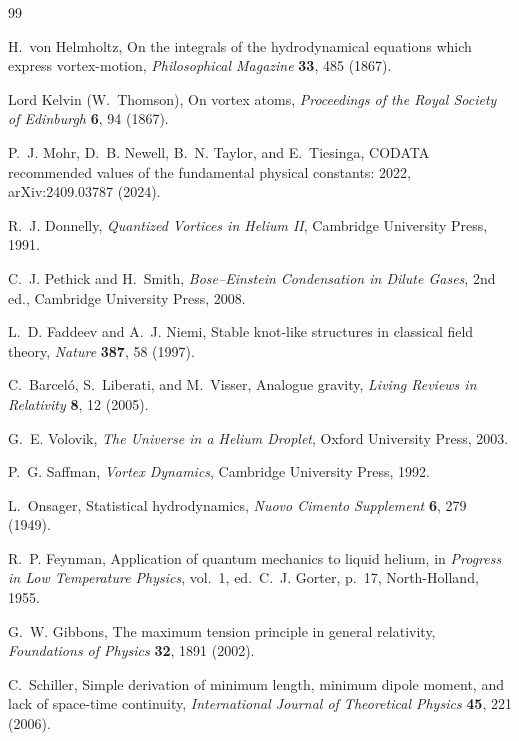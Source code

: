 \documentclass[aps,pra,preprint,longbibliography,nofootinbib]{revtex4-2}
\begin{document}
\begin{thebibliography}{99}

H.~von Helmholtz,
On the integrals of the hydrodynamical equations which express
vortex-motion,
\textit{Philosophical Magazine} \textbf{33}, 485 (1867).

Lord Kelvin (W.~Thomson),
On vortex atoms,
\textit{Proceedings of the Royal Society of Edinburgh} \textbf{6},
94 (1867).

P.~J. Mohr, D.~B. Newell, B.~N. Taylor, and E.~Tiesinga,
CODATA recommended values of the fundamental physical constants: 2022,
arXiv:2409.03787 (2024).

R.~J. Donnelly,
\textit{Quantized Vortices in Helium II},
Cambridge University Press, 1991.

C.~J. Pethick and H.~Smith,
\textit{Bose--Einstein Condensation in Dilute Gases}, 2nd ed.,
Cambridge University Press, 2008.

L.~D. Faddeev and A.~J. Niemi,
Stable knot-like structures in classical field theory,
\textit{Nature} \textbf{387}, 58 (1997).

C.~Barcel\'o, S.~Liberati, and M.~Visser,
Analogue gravity,
\textit{Living Reviews in Relativity} \textbf{8}, 12 (2005).

G.~E. Volovik,
\textit{The Universe in a Helium Droplet},
Oxford University Press, 2003.

P.~G. Saffman,
\textit{Vortex Dynamics},
Cambridge University Press, 1992.

L.~Onsager,
Statistical hydrodynamics,
\textit{Nuovo Cimento Supplement} \textbf{6}, 279 (1949).

R.~P. Feynman,
Application of quantum mechanics to liquid helium,
in \textit{Progress in Low Temperature Physics}, vol.~1,
ed.\ C.~J. Gorter, p.~17, North-Holland, 1955.

G.~W. Gibbons,
The maximum tension principle in general relativity,
\textit{Foundations of Physics} \textbf{32}, 1891 (2002).

C.~Schiller,
Simple derivation of minimum length, minimum dipole moment, and
lack of space-time continuity,
\textit{International Journal of Theoretical Physics} \textbf{45},
221 (2006).


\end{thebibliography}
\end{document}
